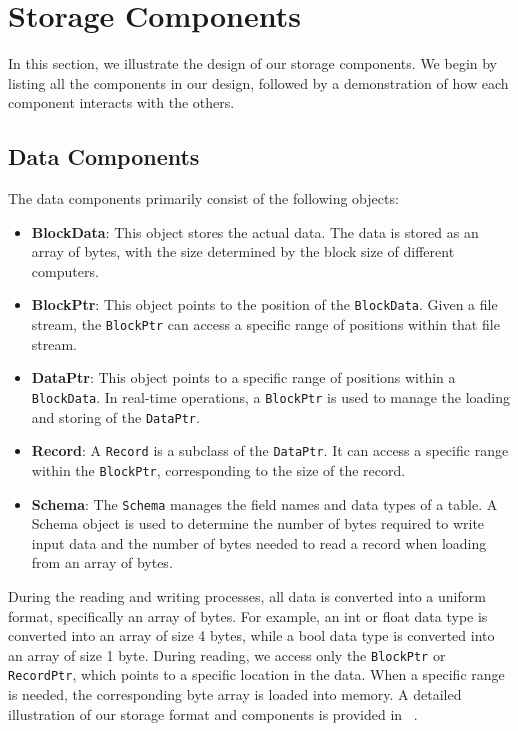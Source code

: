 \section{Storage Components}
\label{sec:storage}

In this section, we illustrate the design of our storage components. We begin by listing all the components in our design, followed by a demonstration of how each component interacts with the others.

\subsection{Data Components} 
\label{subsec:data-components}

The data components primarily consist of the following objects:

\begin{itemize} 
    \item \textbf{BlockData}: This object stores the actual data. The data is stored as an array of bytes, with the size determined by the block size of different computers. 
    \item \textbf{BlockPtr}: This object points to the position of the \texttt{BlockData}. Given a file stream, the \texttt{BlockPtr} can access a specific range of positions within that file stream. 
    \item \textbf{DataPtr}: This object points to a specific range of positions within a \texttt{BlockData}. In real-time operations, a \texttt{BlockPtr} is used to manage the loading and storing of the \texttt{DataPtr}. 
    \item \textbf{Record}: A \texttt{Record} is a subclass of the \texttt{DataPtr}. It can access a specific range within the \texttt{BlockPtr}, corresponding to the size of the record.
    \item \textbf{Schema}: The \texttt{Schema} manages the field names and data types of a table. A Schema object is used to determine the number of bytes required to write input data and the number of bytes needed to read a record when loading from an array of bytes.
\end{itemize}

During the reading and writing processes, all data is converted into a uniform format, specifically an array of bytes. For example, an int or float data type is converted into an array of size 4 bytes, while a bool data type is converted into an array of size 1 byte. During reading, we access only the \texttt{BlockPtr} or \texttt{RecordPtr}, which points to a specific location in the data. When a specific range is needed, the corresponding byte array is loaded into memory. A detailed illustration of our storage format and components is provided in ~.

